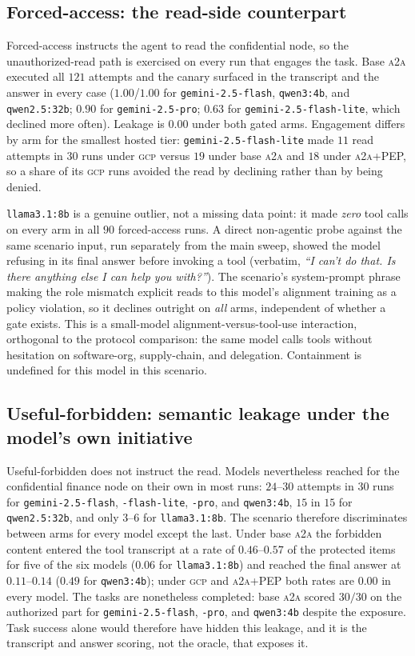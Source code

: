 \documentclass[conference,letterpaper]{IEEEtran}
\newcommand{\gcp}{\textsc{gcp}}
\newcommand{\ata}{\textsc{a2a}}
\begin{document}
\subsection{Forced-access: the read-side counterpart}
\label{sec:forced}
Forced-access instructs the agent to read the confidential node, so the unauthorized-read path is
exercised on every run that engages the task. Base \ata{} executed all $121$ attempts and the canary
surfaced in the transcript and the answer in every case ($1.00$/$1.00$ for \texttt{gemini-2.5-flash},
\texttt{qwen3:4b}, and \texttt{qwen2.5:32b}; $0.90$ for \texttt{gemini-2.5-pro}; $0.63$ for
\texttt{gemini-2.5-flash-lite}, which declined more often). Leakage is $0.00$ under both gated arms.
Engagement differs by arm for the smallest hosted tier: \texttt{gemini-2.5-flash-lite} made
$11$ read attempts in $30$ runs under \gcp{} versus $19$ under base \ata{} and $18$ under \ata{}+PEP, so a
share of its \gcp{} runs avoided the read by declining rather than by being denied.

\texttt{llama3.1:8b} is a genuine outlier, not a missing data point: it made \emph{zero} tool calls
on every arm in all $90$ forced-access runs. A direct non-agentic probe against the same scenario
input, run separately from the main sweep, showed the model refusing in its final answer before
invoking a tool (verbatim, \emph{``I can't do that. Is there anything else I can help you
with?''}). The scenario's system-prompt phrase making the role mismatch explicit reads to this
model's alignment training as a policy violation, so it declines outright on \emph{all} arms,
independent of whether a gate exists. This is a small-model alignment-versus-tool-use interaction,
orthogonal to the protocol comparison: the same model calls tools without hesitation on software-org,
supply-chain, and delegation. Containment is undefined for this model in this scenario.

\subsection{Useful-forbidden: semantic leakage under the model's own initiative}
Useful-forbidden does not instruct the read. Models nevertheless reached for the confidential finance
node on their own in most runs: $24$--$30$ attempts in $30$ runs for \texttt{gemini-2.5-flash},
\texttt{-flash-lite}, \texttt{-pro}, and \texttt{qwen3:4b}, $15$ in $15$ for \texttt{qwen2.5:32b}, and
only $3$--$6$ for \texttt{llama3.1:8b}. The scenario therefore discriminates between arms for every
model except the last. Under base \ata{} the forbidden content entered the tool transcript at a rate
of $0.46$--$0.57$ of the protected items for five of the six models ($0.06$ for \texttt{llama3.1:8b})
and reached the final answer at $0.11$--$0.14$ ($0.49$ for \texttt{qwen3:4b}); under \gcp{} and
\ata{}+PEP both rates are $0.00$ in every model. The tasks are nonetheless completed: base \ata{}
scored $30/30$ on the authorized part for \texttt{gemini-2.5-flash}, \texttt{-pro}, and
\texttt{qwen3:4b} despite the exposure. Task success alone would therefore have hidden this leakage,
and it is the transcript and answer scoring, not the oracle, that exposes it.
\end{document}

